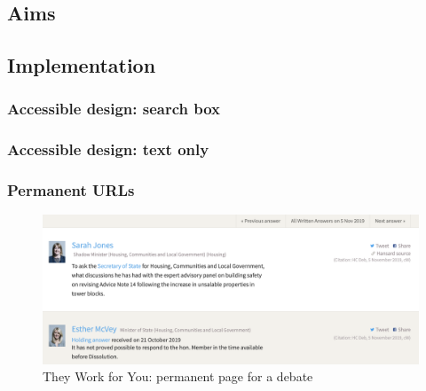 \documentclass{article}
\begin{document}
        \subsection*{Aims}
        
        
        \subsection*{Implementation}
        
        	\subsubsection*{Accessible design: search box}
        	
        	
        	\subsubsection*{Accessible design: text only}
        	

        	\subsubsection*{Permanent URLs}
        	 
        	
			\begin{figure}
				\centering
				\includegraphics[scale=0.5]{images/they-work-for-you-implementation-permanent-urls-1}
				\caption{They Work for You: permanent page for a debate}
				\label{fig:/they-work-for-you-implementation-permanent-urls-1}
			\end{figure}
\end{document}

